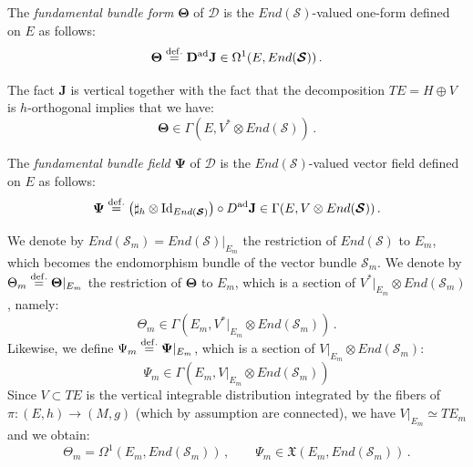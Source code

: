 \documentclass[10pt, cmp, numbook, final, a4paper]{svjour}
\def\ad{\mathrm{ad}}
\newcommand{\eqdef}{\stackrel{{\rm def.}}{=}}
\def\bD{\mathbb{D}}
\def\ad{\mathrm{ad}}
\def\bcD{\boldsymbol{\mathcal{D}}}
\def\bJ{\mathbf{J}}
\def\bJ{\mathbf{J}}
\def\bTheta{\mathbf{\Theta}}
\def\bPsi{\mathbf{\Psi}}
\def\cS{\mathcal{S}}
\def\bD{\mathbf{D}}
\def\bcS{\boldsymbol{\mathcal{S}}}
\def\bD{\mathbf{D}}
\begin{document}
\begin{definition}
The \emph{fundamental bundle form} $\bTheta$ of $\bcD$ is
the $End(\bcS)$-valued one-form defined on $E$ as follows:
\begin{equation*}
\bTheta \eqdef \bD^{\ad} \bJ \in \Omega^{1}(E,End(\bcS))\, .
\end{equation*}
\end{definition}

\noindent
The fact $\bJ$ is vertical together with the fact that the
decomposition $TE = H\oplus V$ is $h$-orthogonal implies that we have:
\begin{equation*}
\bTheta \in \Gamma(E, V^{\ast}\otimes End(\bcS))\, .
\end{equation*}

\begin{definition}
The \emph{fundamental bundle field} $\bPsi$ of $\bcD$ is
the $End(\bcS)$-valued vector field defined on $E$ as follows:
\begin{equation*}
\bPsi \eqdef \left(\sharp_{h}\otimes \mathrm{Id}_{End(\bcS)} \right)\circ D^{\ad} \bJ \in \Gamma(E,V\otimes End(\bcS))\, .
\end{equation*}
\end{definition}

\noindent
We denote by $End(\cS_{m}) = End(\bcS)|_{E_{m}}$ the restriction of
$End(\bcS)$ to $E_{m}$, which becomes the endomorphism bundle of the
vector bundle $\cS_{m}$. We denote by $\Theta_{m}\eqdef
\bTheta|_{E_{m}}$ the restriction of $\bTheta$ to $E_{m}$, which is a
section of $V^{\ast}|_{E_{m}}\otimes End(\cS_{m})$, namely:
\begin{equation*}
\Theta_{m} \in \Gamma(E_{m}, V^{\ast}|_{E_{m}}\otimes End(\cS_{m}))\, .
\end{equation*}
Likewise, we define $\Psi_{m}\eqdef \bPsi|_{E_{m}}$, which is a
section of $V|_{E_{m}}\otimes End(\cS_{m})$:
\begin{equation*}
\Psi_{m} \in \Gamma(E_{m}, V|_{E_{m}}\otimes End(\cS_{m}))
\end{equation*}
Since $V\subset TE$ is the vertical integrable distribution integrated
by the fibers of $\pi\colon (E,h)\to (M,g)$ (which by assumption are
connected), we have $V|_{E_{m}} \simeq TE_{m}$ and we obtain:
\begin{equation*}
\Theta_{m} = \Omega^{1}(E_{m}, End(\cS_{m}))\, , \qquad \Psi_{m}\in \mathfrak{X}(E_{m},End(\cS_{m}))\, .
\end{equation*}
\end{document}
